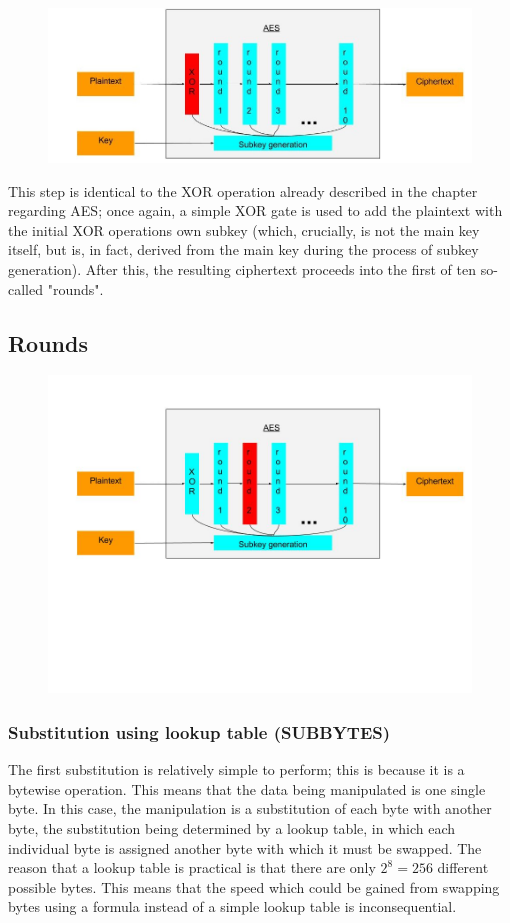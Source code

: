 \documentclass[12pt]{report}
\begin{document}
\begin{figure}[H]
\centering
\includegraphics[scale=0.4]{AES_fig2.jpg}
\end{figure}

This step is identical to the XOR operation already described in the chapter regarding AES; once again, a simple XOR gate is used to add the plaintext with the initial XOR operations own subkey (which, crucially, is not the main key itself, but is, in fact, derived from the main key during the process of subkey generation). After this, the resulting ciphertext proceeds into the first of ten so-called "rounds".

\subsection{Rounds}

\begin{figure}[H]
\centering
\includegraphics[scale=0.4]{AES_fig3.jpg}
\end{figure}

\subsubsection{Substitution using lookup table (SUBBYTES)}
The first substitution is relatively simple to perform; this is because it is a bytewise operation. This means that the data being manipulated is one single byte. In this case, the manipulation is a substitution of each byte with another byte, the substitution being determined by a lookup table, in which each individual byte is assigned another byte with which it must be swapped. The reason that a lookup table is practical is that there are only $2^8 = 256$ different possible bytes. This means that the speed which could be gained from swapping bytes using a formula instead of a simple lookup table is inconsequential.
\end{document}
